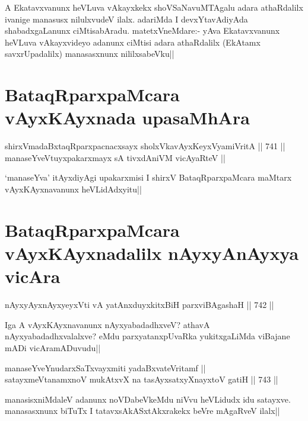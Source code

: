 \begin{artha} 
A Ekatavxvanunx heVLuva vAkayxkekx shoVSaNavuMTAgalu adara athaRdalilx 
ivanige manasusx nilulxvudeV ilalx. adariMda I devxYtavAdiyAda 
shabadxgaLanunx ciMtisabAradu. matetxVneMdare:- yAva Ekatavxvanunx 
heVLuva vAkayxvideyo adanunx ciMtisi adara athaRdalilx (EkAtamx 
savxrUpadalilx) manasasxnunx nililxsabeVku||
\end{artha}

\section*{BataqRparxpaMcara vAyxKAyxnada upasaMhAra}

\begin{shl}
shirxVmadaBxtaqRparxpacnacxsayx sholxVkavAyxKeyxVyamiVritA ||  741 ||  \\
manaseYveVtuyxpakarxmayx sA tivxdAniVM vicAyaRteV ||
\end{shl}

\begin{artha} 
`manaseYva' itAyxdiyAgi upakarxmisi I shirxV BataqRparxpaMcara maMtarx 
vAyxKAyxnavanunx heVLidAdxyitu||
\end{artha}

\section*{BataqRparxpaMcara vAyxKAyxnadalilx nAyxyAnAyxya vicAra}

\begin{shl}
nAyxyAyx\s nAyxyeyxVti vA yatAnxduyxkitxBiH parxviBAgashaH ||  742 ||  
\end{shl}

\begin{artha} 
Iga A vAyxKAyxnavanunx nAyxyabadadhxveV? athavA nAyxyabadadhxvalalxve? 
eMdu parxyatanxpUvaRka yukitxgaLiMda viBajane mADi vicAramADuvudu||
\end{artha}


\begin{shl}
manaseYveYnudarxSaTxvayxmiti yadaBxvateVritamf || \\
satayxmeVtanamxnoV mukAtxvX na tasAyxsatxyXnayxtoV gatiH ||  743 ||  
\end{shl}

\begin{artha} 
manasisxniMdaleV adanunx noVDabeVkeMdu niVvu heVLidudx idu satayxve. 
manasasxnunx biTuTx I tatavxsAkASxtAkxrakekx beVre mAgaRveV ilalx||
\end{artha}


